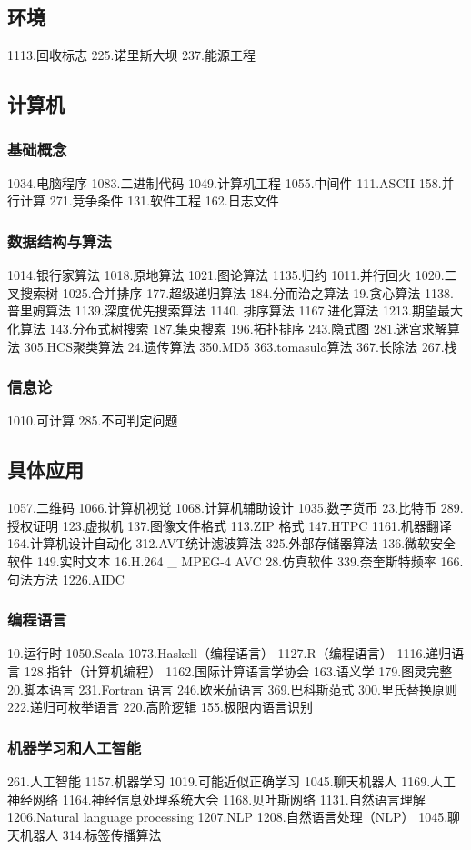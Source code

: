 \subsection{环境}
1113.回收标志
225.诺里斯大坝
237.能源工程

\subsection{计算机}
\subsubsection{基础概念}
1034.电脑程序
1083.二进制代码
1049.计算机工程
1055.中间件
111.ASCII
158.并行计算
271.竞争条件
131.软件工程
162.日志文件
\subsubsection{数据结构与算法}
1014.银行家算法
1018.原地算法
1021.图论算法
1135.归约
1011.并行回火
1020.二叉搜索树
1025.合并排序
177.超级递归算法
184.分而治之算法
19.贪心算法
1138.普里姆算法
1139.深度优先搜索算法
1140. 排序算法
1167.进化算法
1213.期望最大化算法
143.分布式树搜索
187.集束搜索
196.拓扑排序
243.隐式图
281.迷宫求解算法
305.HCS聚类算法
24.遗传算法
350.MD5
363.tomasulo算法
367.长除法
267.栈
\subsubsection{信息论}
1010.可计算
285.不可判定问题
\subsection{具体应用}
1057.二维码
1066.计算机视觉
1068.计算机辅助设计
1035.数字货币
23.比特币
289.授权证明
123.虚拟机
137.图像文件格式
113.ZIP 格式
147.HTPC
1161.机器翻译
164.计算机设计自动化
312.AVT统计滤波算法
325.外部存储器算法
136.微软安全软件
149.实时文本
16.H.264 _ MPEG-4 AVC
28.仿真软件
339.奈奎斯特频率
166.句法方法
1226.AIDC
\subsubsection{编程语言}
10.运行时
1050.Scala
1073.Haskell（编程语言）
1127.R（编程语言）
1116.递归语言
128.指针（计算机编程）
1162.国际计算语言学协会
163.语义学
179.图灵完整
20.脚本语言
231.Fortran 语言
246.欧米茄语言
369.巴科斯范式
300.里氏替换原则
222.递归可枚举语言
220.高阶逻辑
155.极限内语言识别
  
\subsubsection{机器学习和人工智能}
261.人工智能
1157.机器学习
1019.可能近似正确学习
1045.聊天机器人
1169.人工神经网络
1164.神经信息处理系统大会
1168.贝叶斯网络
1131.自然语言理解
1206.Natural language processing
1207.NLP
1208.自然语言处理（NLP）
1045.聊天机器人
314.标签传播算法
